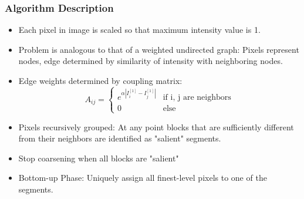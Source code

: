 \documentclass[8pt]{beamer}
\begin{document}
\begin{frame}
\frametitle{Algorithm Description}
\begin{minipage}{.5\textwidth}
\begin{itemize}
\item Each pixel in image is scaled so that maximum intensity value is 1.
\item Problem is analogous to that of a weighted undirected graph: Pixels represent nodes, edge determined by similarity of intensity with neighboring nodes.
\item Edge weights determined by coupling matrix: 
$$ A_{ij} = \left\{ \begin{array}{lr} e^{\alpha \left| I_i^{[1]}-I_j^{[1]} \right|} & \text{if i, j are neighbors} \\
0 & \text{else} \end{array} \right. $$
\item Pixels recursively grouped: At any point blocks that are sufficiently different from their neighbors are identified as "salient" segments.
\item Stop coarsening when all blocks are "salient"
\item Bottom-up Phase: Uniquely assign all finest-level pixels to one of the segments.
\end{itemize}
\end{minipage}
\hspace{.05\textwidth}
\begin{minipage}{.4\textwidth}

\end{minipage}
\end{frame}
\end{document}
